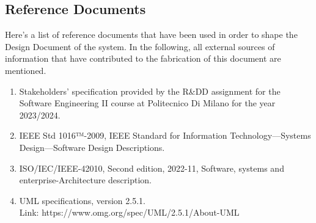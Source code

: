 \subsection{Reference Documents}
Here's a list of reference documents that have been used in order to shape the Design Document of the \app system. In the following, all external sources of information that have contributed to the fabrication of this document are mentioned.

\begin{enumerate}[]
	\item Stakeholders' specification provided by the R\&DD assignment for the Software Engineering II course at Politecnico Di Milano for the year 2023/2024.
	\item IEEE Std 1016™-2009, IEEE Standard for Information	Technology—Systems Design—Software Design Descriptions.
	\item ISO/IEC/IEEE-42010, Second edition, 2022-11, Software, systems and enterprise-Architecture description.
	\item UML specifications, version 2.5.1. \\Link: https://www.omg.org/spec/UML/2.5.1/About-UML
	
\end{enumerate}
